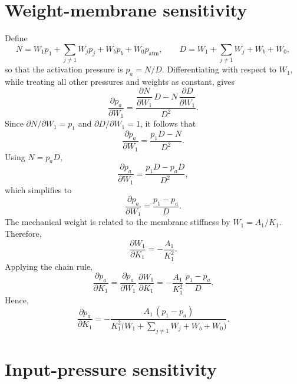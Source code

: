 \documentclass[11pt,a4paper]{article}
\numberwithin{equation}{section}
\newcommand{\patm}{p_{\mathrm{atm}}}
\begin{document}
\begin{appendices}
\section{Weight-membrane sensitivity}
\label{app:weight-sensitivity}

Define
\begin{equation}
  N = W_1 p_1 + \sum_{j\neq 1} W_j p_j + W_b p_b + W_0 \patm,
  \qquad
  D = W_1 + \sum_{j\neq 1} W_j + W_b + W_0,
\end{equation}
so that the activation pressure is $p_a = N/D$. Differentiating with respect to $W_1$, while treating all other
pressures and weights as constant, gives
\begin{equation}
  \frac{\partial p_a}{\partial W_1}
    = \frac{\dfrac{\partial N}{\partial W_1}\,D - N\,\dfrac{\partial D}{\partial W_1}}{D^2} .
\end{equation}
Since $\partial N/\partial W_1 = p_1$ and $\partial D/\partial W_1 = 1$, it follows that
\begin{equation}
  \frac{\partial p_a}{\partial W_1} = \frac{p_1 D - N}{D^2} .
\end{equation}
Using $N = p_a D$,
\begin{equation}
  \frac{\partial p_a}{\partial W_1} = \frac{p_1 D - p_a D}{D^2},
\end{equation}
which simplifies to
\begin{equation}
  \boxed{\frac{\partial p_a}{\partial W_1} = \frac{p_1 - p_a}{D}} .
\end{equation}
The mechanical weight is related to the membrane stiffness by $W_1 = A_1/K_1$. Therefore,
\begin{equation}
  \frac{\partial W_1}{\partial K_1} = -\frac{A_1}{K_1^2} .
\end{equation}
Applying the chain rule,
\begin{equation}
  \frac{\partial p_a}{\partial K_1} = \frac{\partial p_a}{\partial W_1}\,\frac{\partial W_1}{\partial K_1}
    = -\frac{A_1}{K_1^2}\,\frac{p_1 - p_a}{D} .
\end{equation}
Hence,
\begin{equation}
  \boxed{\frac{\partial p_a}{\partial K_1}
    = -\frac{A_1\,(p_1 - p_a)}{K_1^2\bigl(W_1 + \sum_{j\neq 1} W_j + W_b + W_0\bigr)}} .
\end{equation}

\section{Input-pressure sensitivity}
\label{app:input-sensitivity}


\end{appendices}
\end{document}
